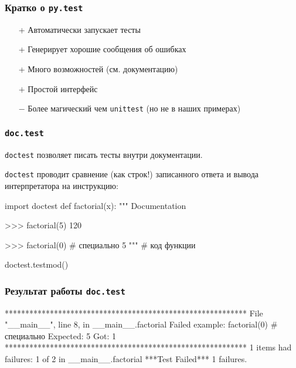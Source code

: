 \documentclass[fleqn, xcolor=x11names]{beamer}
\begin{document}
\begin{frame}[fragile]\frametitle{Кратко о \texttt{py.test}}
\begin{itemize}
\item[+] Автоматически запускает тесты

\item[+] Генерирует хорошие сообщения об ошибках

\item[+] Много возможностей (см. документацию)

\item[$+$] Простой интерфейс

\item[$-$] Более магический чем \texttt{unittest} (но не в наших примерах)
\end{itemize}
\end{frame}






\begin{frame}[fragile]\frametitle{\texttt{doc.test}}
\texttt{doctest} позволяет писать тесты внутри документации.

\texttt{doctest} проводит сравнение (как строк!) записанного ответа и вывода интерпретатора на инструкцию:
\begin{pcode}
import doctest
def factorial(x):
    """
    Documentation
    
    >>> factorial(5)
    120
    
    >>> factorial(0) # специально
    5 
    """
    # код функции
    
doctest.testmod()
\end{pcode}
\end{frame}

\begin{frame}[fragile]\frametitle{Результат работы \texttt{doc.test}}
\begin{pcode}
***********************************************************
File "__main__", line 8, in __main__.factorial
Failed example:
    factorial(0) # специально
Expected:
    5 
Got:
    1
***********************************************************
1 items had failures:
   1 of   2 in __main__.factorial
***Test Failed*** 1 failures.
\end{pcode}
\end{frame}
\end{document}
